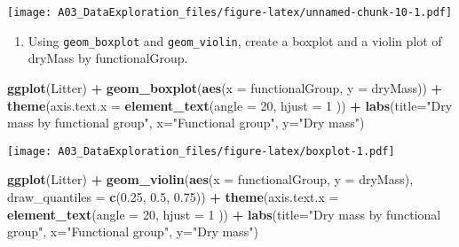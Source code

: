 \documentclass[
]{article}
\newenvironment{Shaded}{\begin{snugshade}}{\end{snugshade}}
\newcommand{\DataTypeTok}[1]{\textcolor[rgb]{0.13,0.29,0.53}{#1}}
\newcommand{\DecValTok}[1]{\textcolor[rgb]{0.00,0.00,0.81}{#1}}
\newcommand{\FloatTok}[1]{\textcolor[rgb]{0.00,0.00,0.81}{#1}}
\newcommand{\KeywordTok}[1]{\textcolor[rgb]{0.13,0.29,0.53}{\textbf{#1}}}
\newcommand{\NormalTok}[1]{#1}
\newcommand{\OperatorTok}[1]{\textcolor[rgb]{0.81,0.36,0.00}{\textbf{#1}}}
\newcommand{\StringTok}[1]{\textcolor[rgb]{0.31,0.60,0.02}{#1}}
\providecommand{\tightlist}{%
  \setlength{\itemsep}{0pt}\setlength{\parskip}{0pt}}
\begin{document}
\texttt{[image: A03\_DataExploration\_files/figure-latex/unnamed-chunk-10-1.pdf]}

\begin{enumerate}
\def\labelenumi{\arabic{enumi}.}
\setcounter{enumi}{14}
\tightlist
\item
  Using \texttt{geom\_boxplot} and \texttt{geom\_violin}, create a
  boxplot and a violin plot of dryMass by functionalGroup.
\end{enumerate}

\begin{Shaded}
\begin{Highlighting}[]
\KeywordTok{ggplot}\NormalTok{(Litter) }\OperatorTok{+}
\StringTok{  }\KeywordTok{geom_boxplot}\NormalTok{(}\KeywordTok{aes}\NormalTok{(}\DataTypeTok{x =}\NormalTok{ functionalGroup, }\DataTypeTok{y =}\NormalTok{ dryMass)) }\OperatorTok{+}
\StringTok{  }\KeywordTok{theme}\NormalTok{(}\DataTypeTok{axis.text.x =} \KeywordTok{element_text}\NormalTok{(}\DataTypeTok{angle =} \DecValTok{20}\NormalTok{, }\DataTypeTok{hjust =} \DecValTok{1}\NormalTok{ )) }\OperatorTok{+}
\StringTok{  }\KeywordTok{labs}\NormalTok{(}\DataTypeTok{title=}\StringTok{"Dry mass by functional group"}\NormalTok{, }\DataTypeTok{x=}\StringTok{"Functional group"}\NormalTok{, }\DataTypeTok{y=}\StringTok{"Dry mass"}\NormalTok{)}
\end{Highlighting}
\end{Shaded}

\texttt{[image: A03\_DataExploration\_files/figure-latex/boxplot-1.pdf]}

\begin{Shaded}
\begin{Highlighting}[]
\KeywordTok{ggplot}\NormalTok{(Litter) }\OperatorTok{+}
\StringTok{  }\KeywordTok{geom_violin}\NormalTok{(}\KeywordTok{aes}\NormalTok{(}\DataTypeTok{x =}\NormalTok{ functionalGroup, }\DataTypeTok{y =}\NormalTok{ dryMass), }
              \DataTypeTok{draw_quantiles =} \KeywordTok{c}\NormalTok{(}\FloatTok{0.25}\NormalTok{, }\FloatTok{0.5}\NormalTok{, }\FloatTok{0.75}\NormalTok{)) }\OperatorTok{+}
\StringTok{   }\KeywordTok{theme}\NormalTok{(}\DataTypeTok{axis.text.x =} \KeywordTok{element_text}\NormalTok{(}\DataTypeTok{angle =} \DecValTok{20}\NormalTok{, }\DataTypeTok{hjust =} \DecValTok{1}\NormalTok{ )) }\OperatorTok{+}
\StringTok{   }\KeywordTok{labs}\NormalTok{(}\DataTypeTok{title=}\StringTok{"Dry mass by functional group"}\NormalTok{, }\DataTypeTok{x=}\StringTok{"Functional group"}\NormalTok{, }\DataTypeTok{y=}\StringTok{"Dry mass"}\NormalTok{)}
\end{Highlighting}
\end{Shaded}
\end{document}
